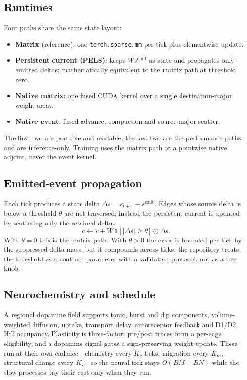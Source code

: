 \documentclass[11pt]{article}
\begin{document}
\subsection{Runtimes}

Four paths share the same state layout:
\begin{itemize}
  \item \textbf{Matrix} (reference): one \texttt{torch.sparse.mm} per tick plus
        elementwise update.
  \item \textbf{Persistent current (PELS)}: keeps $W s^{\text{emit}}$ as state
        and propagates only emitted deltas; mathematically equivalent to the
        matrix path at threshold zero.
  \item \textbf{Native matrix}: one fused CUDA kernel over a single
        destination-major weight array.
  \item \textbf{Native event}: fused advance, compaction and source-major
        scatter.
\end{itemize}
The first two are portable and readable; the last two are the performance paths
and are inference-only. Training uses the matrix path or a pointwise native
adjoint, never the event kernel.

\subsection{Emitted-event propagation}

Each tick produces a state delta $\Delta s = s_{t+1} - s^{\text{emit}}$. Edges
whose source delta is below a threshold $\theta$ are not traversed; instead the
persistent current is updated by scattering only the retained deltas:
\begin{equation}
  c \leftarrow c + W\,\mathbf{1}[|\Delta s| \ge \theta] \odot \Delta s .
\end{equation}
With $\theta = 0$ this is the matrix path. With $\theta > 0$ the error is bounded
per tick by the suppressed delta mass, but it compounds across ticks; the
repository treats the threshold as a contract parameter with a validation
protocol, not as a free knob.

\subsection{Neurochemistry and schedule}

A regional dopamine field supports tonic, burst and dip components, volume-weighted
diffusion, uptake, transport delay, autoreceptor feedback and D1/D2 Hill
occupancy. Plasticity is three-factor: pre/post traces form a per-edge
eligibility, and a dopamine signal gates a sign-preserving weight update. These
run at their own cadence---chemistry every $K_c$ ticks, migration every $K_m$,
structural change every $K_s$---so the neural tick stays $O(BM + BN)$ while the
slow processes pay their cost only when they run.
\end{document}
